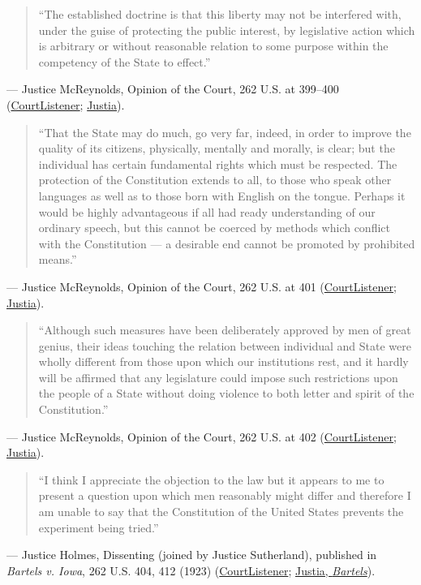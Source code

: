 \documentclass[12pt]{article}
\begin{document}
\begin{quote}
``The established doctrine is that this liberty may not be interfered with, under the guise of protecting the public interest, by legislative action which is arbitrary or without reasonable relation to some purpose within the competency of the State to effect.''
\end{quote}
\noindent --- Justice McReynolds, Opinion of the Court, 262 U.S. at 399--400 (\href{https://www.courtlistener.com/opinion/100233/meyer-v-nebraska/}{CourtListener}; \href{https://supreme.justia.com/cases/federal/us/262/390/}{Justia}).

\begin{quote}
``That the State may do much, go very far, indeed, in order to improve the quality of its citizens, physically, mentally and morally, is clear; but the individual has certain fundamental rights which must be respected. The protection of the Constitution extends to all, to those who speak other languages as well as to those born with English on the tongue. Perhaps it would be highly advantageous if all had ready understanding of our ordinary speech, but this cannot be coerced by methods which conflict with the Constitution --- a desirable end cannot be promoted by prohibited means.''
\end{quote}
\noindent --- Justice McReynolds, Opinion of the Court, 262 U.S. at 401 (\href{https://www.courtlistener.com/opinion/100233/meyer-v-nebraska/}{CourtListener}; \href{https://supreme.justia.com/cases/federal/us/262/390/}{Justia}).

\begin{quote}
``Although such measures have been deliberately approved by men of great genius, their ideas touching the relation between individual and State were wholly different from those upon which our institutions rest, and it hardly will be affirmed that any legislature could impose such restrictions upon the people of a State without doing violence to both letter and spirit of the Constitution.''
\end{quote}
\noindent --- Justice McReynolds, Opinion of the Court, 262 U.S. at 402 (\href{https://www.courtlistener.com/opinion/100233/meyer-v-nebraska/}{CourtListener}; \href{https://supreme.justia.com/cases/federal/us/262/390/}{Justia}).

\begin{quote}
``I think I appreciate the objection to the law but it appears to me to present a question upon which men reasonably might differ and therefore I am unable to say that the Constitution of the United States prevents the experiment being tried.''
\end{quote}
\noindent --- Justice Holmes, Dissenting (joined by Justice Sutherland), published in \textit{Bartels v. Iowa}, 262 U.S. 404, 412 (1923) (\href{https://www.courtlistener.com/opinion/100233/meyer-v-nebraska/}{CourtListener}; \href{https://supreme.justia.com/cases/federal/us/262/404/}{Justia, \textit{Bartels}}).
\end{document}
